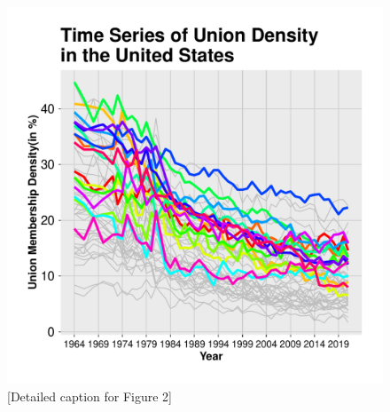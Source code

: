 \documentclass[11pt]{article}\usepackage[]{graphicx}\usepackage[]{xcolor}
\newenvironment{knitrout}{}{} %
\begin{document}
\begin{figure}[h]
\centering
\begin{minipage}{0.9\linewidth}
\begin{knitrout}
\color{fgcolor}

{\centering \includegraphics[width=.8\linewidth]{figure/TimesSeriesUnitedStatesNorth-1} 

}


\end{knitrout}

  \caption{[Detailed caption for Figure 2]}
  \label{fig:3}
  \end{minipage}
\end{figure}
\end{document}
